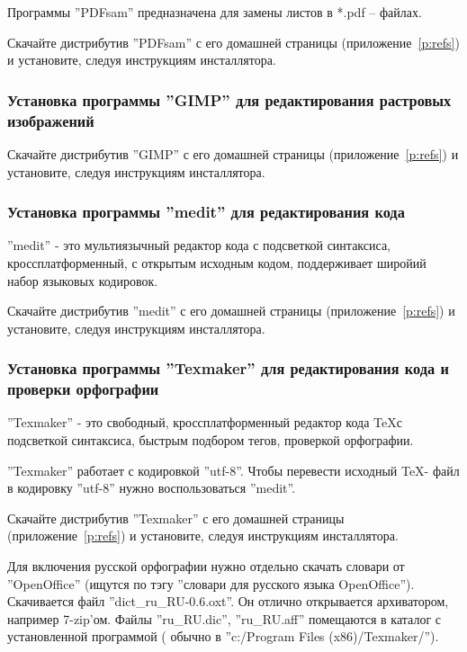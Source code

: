 Программы ''PDFsam'' предназначена для замены листов в *.pdf – файлах. 

Скачайте дистрибутив ''PDFsam'' с его домашней страницы (приложение~\ref{p:refs}) и установите, следуя инструкциям инсталлятора.


\subsubsection{Установка программы ''GIMP'' для редактирования растровых изображений}

Скачайте дистрибутив ''GIMP'' с его домашней страницы (приложение~\ref{p:refs}) и установите, следуя инструкциям инсталлятора.


\subsubsection{Установка программы ''medit'' для редактирования кода}

''medit'' - это мультиязычный редактор кода с подсветкой синтаксиса, кроссплатформенный, с открытым исходным кодом, поддерживает широйий набор языковых кодировок.

Скачайте дистрибутив ''medit'' с его домашней страницы (приложение~\ref{p:refs}) и установите, следуя инструкциям инсталлятора.


\subsubsection{Установка программы ''Texmaker'' для редактирования кода и проверки орфографии}

''Texmaker'' - это свободный, кроссплатформенный редактор кода \TeX с подсветкой синтаксиса, быстрым подбором тегов, проверкой орфографии.

''Texmaker'' работает с кодировкой ''utf-8''. Чтобы перевести исходный \TeX - файл в кодировку ''utf-8'' нужно воспользоваться ''medit''.

Скачайте дистрибутив ''Texmaker'' с его домашней страницы (приложение~\ref{p:refs}) и установите, следуя инструкциям инсталлятора.

Для включения русской орфографии нужно отдельно скачать словари от ''OpenOffice'' (ищутся по тэгу ''словари для русского языка OpenOffice''). Скачивается файл ''dict\_ru\_RU-0.6.oxt''. Он отлично открывается архиватором, например 7-zip'ом. Файлы ''ru\_RU.dic'', ''ru\_RU.aff'' помещаются в каталог с установленной программой ( обычно в ''c:/Program Files (x86)/Texmaker/'').

